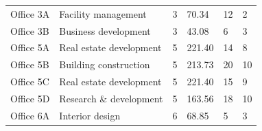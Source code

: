 \begin{tabular}{@{}p{1.45cm}p{4.00cm}M{0.80cm} N{2.0cm} M{2.2cm} M{1.70cm}@{}}
    \toprule
     &  &  &  &  &  \\
    \midrule
    Office 3A & Facility management & 3 & 70.34 & 12 & 2 \\
    Office 3B & Business development & 3 & 43.08 & 6 & 3 \\
    Office 5A & Real estate development & 5 & 221.40 & 14 & 8 \\
    Office 5B & Building construction & 5 & 213.73 & 20 & 10 \\
    Office 5C & Real estate development & 5 & 221.40 & 15 & 9 \\
    Office 5D & Research \& development & 5 & 163.56 & 18 & 10 \\
    Office 6A & Interior design & 6 & 68.85 & 5 & 3 \\
    \bottomrule
\end{tabular}
